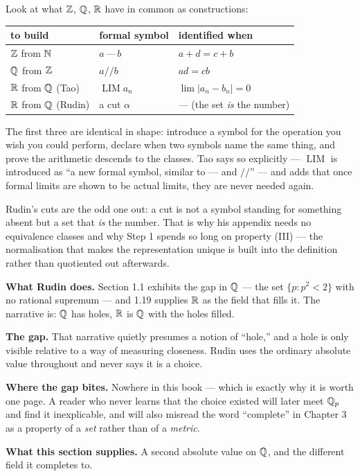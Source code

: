 \begin{unpack}
Look at what $\mathbb{Z}$, $\mathbb{Q}$, $\mathbb{R}$ have in common as constructions:

\smallskip
\begin{tabular}{@{}l l l@{}}
\toprule
\textbf{to build} & \textbf{formal symbol} & \textbf{identified when} \\
\midrule
$\mathbb{Z}$ from $\mathbb{N}$ & $a \,\text{---}\, b$   & $a+d = c+b$ \\
$\mathbb{Q}$ from $\mathbb{Z}$ & $a /\!/ b$             & $ad = cb$ \\
$\mathbb{R}$ from $\mathbb{Q}$ (Tao) & $\operatorname{LIM} a_n$ & $\lim|a_n-b_n| = 0$ \\
$\mathbb{R}$ from $\mathbb{Q}$ (Rudin) & a cut $\alpha$ & --- (the set \emph{is} the number) \\
\bottomrule
\end{tabular}

\smallskip
The first three are identical in shape: introduce a symbol for the operation
you wish you could perform, declare when two symbols name the same thing,
and prove the arithmetic descends to the classes. Tao says so explicitly ---
$\operatorname{LIM}$ is introduced as ``a new formal symbol, similar to
$\text{---}$ and $/\!/$'' --- and adds that once formal limits are shown to
be actual limits, they are never needed again.

Rudin's cuts are the odd one out: a cut is not a symbol standing for
something absent but a set that \emph{is} the number. That is why his
appendix needs no equivalence classes and why Step 1 spends so long on
property (III) --- the normalisation that makes the representation unique is
built into the definition rather than quotiented out afterwards.
\end{unpack}


\begin{roadmap}
\raggedright
\textbf{What Rudin does.} Section 1.1 exhibits the gap in $\mathbb{Q}$ --- the set
$\{p : p^2<2\}$ with no rational supremum --- and 1.19 supplies $\mathbb{R}$ as the
field that fills it. The narrative is: $\mathbb{Q}$ has holes, $\mathbb{R}$ is $\mathbb{Q}$ with the
holes filled.

\smallskip
\textbf{The gap.} That narrative quietly presumes a notion of ``hole,'' and a
hole is only visible relative to a way of measuring closeness. Rudin uses
the ordinary absolute value throughout and never says it is a choice.

\smallskip
\textbf{Where the gap bites.} Nowhere in this book --- which is exactly why
it is worth one page. A reader who never learns that the choice existed will
later meet $\mathbb{Q}_p$ and find it inexplicable, and will also misread the word
``complete'' in Chapter 3 as a property of a \emph{set} rather than of a
\emph{metric}.

\smallskip
\textbf{What this section supplies.} A second absolute value on $\mathbb{Q}$, and the
different field it completes to.
\end{roadmap}

